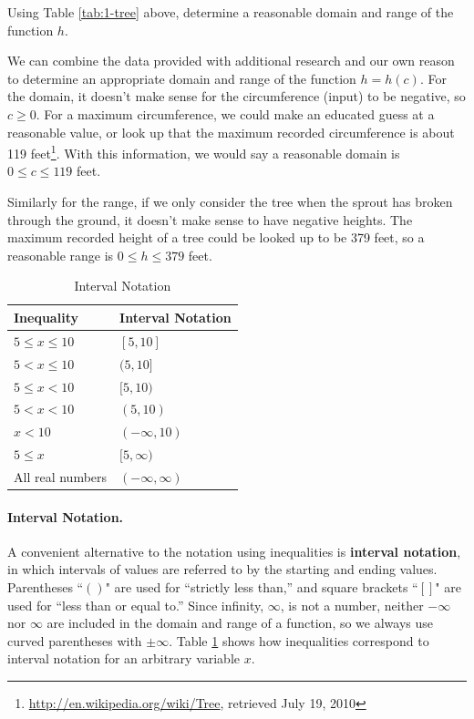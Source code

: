 \begin{example}
Using Table \ref{tab:1-tree} above, determine a reasonable domain and range of the function $h$.

\begin{solution} We can combine the data provided with additional research and our own reason
to determine an appropriate domain and range of the function $h = h(c)$. For
the domain, it doesn't make sense for the circumference (input) to be negative, so $c \ge 0$. For a maximum circumference, we could make an educated guess at a reasonable value, or
look up that the maximum recorded circumference is about 119
feet\footnote{\url{http://en.wikipedia.org/wiki/Tree}, retrieved July
  19, 2010}. With this information, we would say a reasonable domain is $0\le c \le 119$ feet.

Similarly for the range, if we only consider the tree when the sprout has broken through the ground, it doesn't make sense to have negative heights. The maximum recorded height of a tree could be looked up to be 379 feet, so a reasonable range is $0\le h\le 379$ feet.
\end{solution}\end{example}

\begin{table}
    \centering
\begin{tabular}{ll}
\toprule
\textbf{Inequality} & \textbf{Interval Notation}\tabularnewline
\midrule
$5\le x \le 10$  & $[5, 10]$\\
$5 <  x \le 10$  & $(5, 10]$\\
$5\le x  <  10$  & $[5, 10)$\\
$5 <  x  <  10$  & $(5, 10)$\\
$x < 10$         & $(-\infty, 10)$\\
$5 \le x$        & $[5, \infty)$\\
All real numbers & $(-\infty, \infty)$ \\
\bottomrule
\end{tabular}
\caption{Interval Notation}
\label{tab:1-interval}
\end{table}
\paragraph{Interval Notation.} A convenient alternative to the notation using inequalities is \textbf{interval notation}, in which intervals of values are referred to by the starting and ending values. Parentheses ``$()$" are used for ``strictly less than,'' and square brackets ``$[]$" are used for ``less than or equal to.'' Since infinity, $\infty$, is not a number, neither $-\infty$ nor $\infty$ are included in the domain and range of a function, so we always use curved parentheses with $\pm\infty$. Table \ref{tab:1-interval} shows how inequalities correspond to interval notation for an arbitrary variable $x$.

